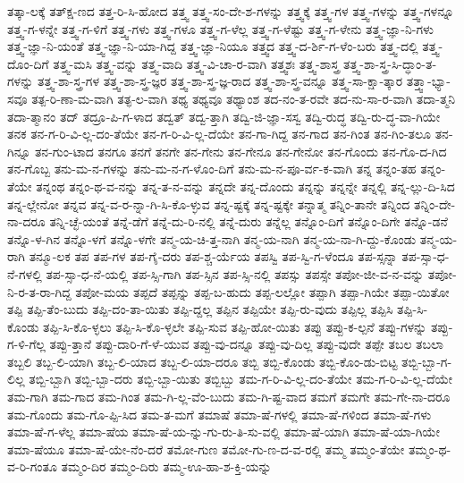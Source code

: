 {ತತ್ಕಾ-ಲಕ್ಕೆ
ತತ್ಕ್ಷ-ಣದ
ತತ್ತ-ರಿ-ಸಿ-ಹೋದ
ತತ್ತ್ವ
ತತ್ತ್ವ-ಸಂ-ದೇ-ಶ-ಗಳನ್ನು
ತತ್ತ್ವಕ್ಕೆ
ತತ್ತ್ವ-ಗಳ
ತತ್ತ್ವ-ಗಳನ್ನು
ತತ್ತ್ವ-ಗಳನ್ನೂ
ತತ್ತ್ವ-ಗ-ಳನ್ನೇ
ತತ್ತ್ವ-ಗ-ಳಿಗೆ
ತತ್ತ್ವ-ಗಳು
ತತ್ತ್ವ-ಗಳೂ
ತತ್ತ್ವ-ಗ-ಳೆಲ್ಲ
ತತ್ತ್ವ-ಗ-ಳೆಷ್ಟು
ತತ್ತ್ವ-ಗ-ಳೇನು
ತತ್ತ್ವ-ಜ್ಞಾ-ನಿ-ಗಳು
ತತ್ತ್ವ-ಜ್ಞಾ-ನಿ-ಯಂತೆ
ತತ್ತ್ವ-ಜ್ಞಾ-ನಿ-ಯಾ-ಗಿದ್ದ
ತತ್ತ್ವ-ಜ್ಞಾ-ನಿಯೂ
ತತ್ತ್ವದ
ತತ್ತ್ವ-ದ-ರ್ಶಿ-ಗ-ಳೆಂ-ಬರು
ತತ್ತ್ವ-ದಲ್ಲಿ
ತತ್ತ್ವ-ದೊಂ-ದಿಗೆ
ತತ್ತ್ವ-ಮಸಿ
ತತ್ತ್ವ-ವನ್ನು
ತತ್ತ್ವ-ವಾದಿ
ತತ್ತ್ವ-ವಿ-ಚಾ-ರ-ವಾಗಿ
ತತ್ತ್ವಶಃ
ತತ್ತ್ವ-ಶಾಸ್ತ್ರ
ತತ್ತ್ವ-ಶಾ-ಸ್ತ್ರ-ಸಿ-ದ್ಧಾಂ-ತ-ಗಳನ್ನು
ತತ್ತ್ವ-ಶಾ-ಸ್ತ್ರ-ಗಳ
ತತ್ತ್ವ-ಶಾ-ಸ್ತ್ರ-ಜ್ಞರ
ತತ್ತ್ವ-ಶಾ-ಸ್ತ್ರ-ಜ್ಞ-ರಾದ
ತತ್ತ್ವ-ಶಾ-ಸ್ತ್ರ-ವನ್ನೂ
ತತ್ತ್ವ-ಸಾ-ಕ್ಷಾ-ತ್ಕಾರ
ತತ್ತ್ವಾ-ಭ್ಯಾ-ಸವೂ
ತತ್ಪ-ರಿ-ಣಾ-ಮ-ವಾಗಿ
ತತ್ಫ-ಲ-ವಾಗಿ
ತಥ್ಯ
ತಥ್ಯವೂ
ತಥ್ಯಾಂಶ
ತದ-ನಂ-ತ-ರವೇ
ತದ-ನು-ಸಾ-ರ-ವಾಗಿ
ತದಾ-ತ್ಮನಿ
ತದಾ-ತ್ಮಾನಂ
ತದ್
ತದ್ರೂ-ಪಿ-ಗ-ಳಾದ
ತದ್ವತ್
ತದ್ವ-ತ್ತಾಗಿ
ತದ್ವಿ-ಜಿ-ಜ್ಞಾ-ಸಸ್ವ
ತದ್ವಿ-ರುದ್ಧ
ತದ್ವಿ-ರು-ದ್ಧ-ವಾ-ಗಿಯೇ
ತನಕ
ತನ-ಗ-ರಿ-ವಿ-ಲ್ಲ-ದಂ-ತೆಯೇ
ತನ-ಗ-ರಿ-ವಿ-ಲ್ಲ-ದೆಯೇ
ತನ-ಗಾ-ಗಿದ್ದ
ತನ-ಗಾದ
ತನ-ಗಿಂತ
ತನ-ಗಿಂ-ತಲೂ
ತನ-ಗಿನ್ನೂ
ತನ-ಗುಂ-ಟಾದ
ತನಗೂ
ತನಗೆ
ತನಗೇ
ತನ-ಗೇನು
ತನ-ಗೇನೂ
ತನ-ಗೇನೋ
ತನ-ಗೊಂದು
ತನ-ಗೊ-ದ-ಗಿದ
ತನ-ಗೊಬ್ಬ
ತನು-ಮ-ನ-ಗಳನ್ನು
ತನು-ಮ-ನ-ಗ-ಳೊಂ-ದಿಗೆ
ತನು-ಮ-ನ-ಪೂ-ರ್ವ-ಕ-ವಾಗಿ
ತನ್ನ
ತನ್ನಂ-ತಹ
ತನ್ನಂ-ತೆಯೇ
ತನ್ನಂಥ
ತನ್ನಂ-ಥ-ವ-ನನ್ನು
ತನ್ನ-ತ-ನ-ವನ್ನು
ತನ್ನದೇ
ತನ್ನ-ದೊಂದು
ತನ್ನನ್ನು
ತನ್ನನ್ನೇ
ತನ್ನಲ್ಲಿ
ತನ್ನ-ಲ್ಲು-ದಿ-ಸಿದ
ತನ್ನ-ಲ್ಲೇನೋ
ತನ್ನವ
ತನ್ನ-ವ-ರ-ನ್ನಾ-ಗಿ-ಸಿ-ಕೊ-ಳ್ಳುವ
ತನ್ನ-ಷ್ಟಕ್ಕೆ
ತನ್ನ-ಷ್ಟಕ್ಕೇ
ತನ್ನಾತ್ಮ
ತನ್ನಿಂ-ತಾನೇ
ತನ್ನಿಂದ
ತನ್ನಿಂ-ದೇ-ನಾ-ದರೂ
ತನ್ನಿ-ಚ್ಛೆ-ಯಂತೆ
ತನ್ನೆ-ಡೆಗೆ
ತನ್ನೆ-ದು-ರಿ-ನಲ್ಲಿ
ತನ್ನೆ-ದುರು
ತನ್ನೆಲ್ಲ
ತನ್ನೊಂ-ದಿಗೆ
ತನ್ನೊಂ-ದಿಗೇ
ತನ್ನೊ-ಡನೆ
ತನ್ನೊ-ಳ-ಗಿನ
ತನ್ನೊ-ಳಗೆ
ತನ್ನೊ-ಳಗೇ
ತನ್ಮ-ಯ-ಚಿ-ತ್ತ-ನಾಗಿ
ತನ್ಮ-ಯ-ನಾಗಿ
ತನ್ಮ-ಯ-ನಾ-ಗಿ-ದ್ದು-ಕೊಂಡು
ತನ್ಮ-ಯ-ರಾಗಿ
ತನ್ಮೂ-ಲಕ
ತಪ
ತಪ-ಗಳ
ತಪ-ಗೈ-ದರು
ತಪ-ಶ್ಚ-ರ್ಯೆಯ
ತಪಸ್ವಿ
ತಪ-ಸ್ವಿ-ಗ-ಳೆಂದೂ
ತಪ-ಸ್ಸನ್ನಾ
ತಪ-ಸ್ಸಾ-ಧ-ನೆ-ಗಳಲ್ಲಿ
ತಪ-ಸ್ಸಾ-ಧ-ನೆ-ಯಲ್ಲಿ
ತಪ-ಸ್ಸಿ-ಗಾಗಿ
ತಪ-ಸ್ಸಿನ
ತಪ-ಸ್ಸಿ-ನಲ್ಲಿ
ತಪಸ್ಸು
ತಪಸ್ಸೇ
ತಪೋ-ಜೀ-ವ-ನ-ವನ್ನು
ತಪೋ-ನಿ-ರ-ತ-ರಾ-ಗಿದ್ದ
ತಪೋ-ಮಯ
ತಪ್ಪದೆ
ತಪ್ಪನ್ನು
ತಪ್ಪ-ಬ-ಹುದು
ತಪ್ಪ-ಲಲ್ಲೋ
ತಪ್ಪಾಗಿ
ತಪ್ಪಾ-ಗಿಯೇ
ತಪ್ಪಾ-ಯಿತೋ
ತಪ್ಪಿ
ತಪ್ಪಿ-ತೆಂ-ಬುದು
ತಪ್ಪಿ-ದಂ-ತಾ-ಯಿತು
ತಪ್ಪಿ-ದ್ದಲ್ಲ
ತಪ್ಪಿನ
ತಪ್ಪಿಯೇ
ತಪ್ಪಿ-ರು-ವುದು
ತಪ್ಪಿಲ್ಲ
ತಪ್ಪಿಸಿ
ತಪ್ಪಿ-ಸಿ-ಕೊಂಡು
ತಪ್ಪಿ-ಸಿ-ಕೊ-ಳ್ಳಲು
ತಪ್ಪಿ-ಸಿ-ಕೊ-ಳ್ಳಲೇ
ತಪ್ಪಿ-ಸುವ
ತಪ್ಪಿ-ಹೋ-ಯಿತು
ತಪ್ಪು
ತಪ್ಪು-ಕ-ಲ್ಪನೆ
ತಪ್ಪು-ಗಳನ್ನು
ತಪ್ಪು-ಗ-ಳಿ-ಗೆಲ್ಲ
ತಪ್ಪು-ತ್ತಾನೆ
ತಪ್ಪು-ದಾರಿ-ಗೆ-ಳೆ-ಯುವ
ತಪ್ಪು-ವು-ದನ್ನೂ
ತಪ್ಪು-ವು-ದಿಲ್ಲ
ತಪ್ಪು-ವುದೇ
ತಪ್ಪೇ
ತಬಲ
ತಬಲಾ
ತಬ್ಬಲಿ
ತಬ್ಬ-ಲಿ-ಯಾಗಿ
ತಬ್ಬ-ಲಿ-ಯಾದ
ತಬ್ಬ-ಲಿ-ಯಾ-ದರೂ
ತಬ್ಬಿ
ತಬ್ಬಿ-ಕೊಂಡು
ತಬ್ಬಿ-ಕೊಂ-ಡು-ಬಿಟ್ಟ
ತಬ್ಬಿ-ಬ್ಬಾ-ಗ-ಲಿಲ್ಲ
ತಬ್ಬಿ-ಬ್ಬಾಗಿ
ತಬ್ಬಿ-ಬ್ಬಾ-ದರು
ತಬ್ಬಿ-ಬ್ಬಾ-ಯಿತು
ತಬ್ಬಿಬ್ಬು
ತಮ-ಗ-ರಿ-ವಿ-ಲ್ಲ-ದಂ-ತೆಯೇ
ತಮ-ಗ-ರಿ-ವಿ-ಲ್ಲ-ದೆಯೇ
ತಮ-ಗಾಗಿ
ತಮ-ಗಾದ
ತಮ-ಗಿಂತ
ತಮ-ಗಿ-ಲ್ಲ-ವೆಂ-ಬುದು
ತಮ-ಗಿ-ಷ್ಟ-ವಾದ
ತಮಗೆ
ತಮಗೇ
ತಮ-ಗೇ-ನಾ-ದರೂ
ತಮ-ಗೊಂದು
ತಮ-ಗೊ-ಪ್ಪಿ-ಸಿದ
ತಮ-ತ-ಮಗೆ
ತಮಾಷೆ
ತಮಾ-ಷೆ-ಗಳಲ್ಲಿ
ತಮಾ-ಷೆ-ಗಳಿಂದ
ತಮಾ-ಷೆ-ಗಳು
ತಮಾ-ಷೆ-ಗ-ಳೆಲ್ಲ
ತಮಾ-ಷೆಯ
ತಮಾ-ಷೆ-ಯ-ನ್ನು-ಗು-ರು-ತಿ-ಸು-ವಲ್ಲಿ
ತಮಾ-ಷೆ-ಯಾಗಿ
ತಮಾ-ಷೆ-ಯಾ-ಗಿಯೇ
ತಮಾ-ಷೆಯೂ
ತಮಾ-ಷೆ-ಯೇ-ನೆಂ-ದರೆ
ತಮೋ-ಗುಣ
ತಮೋ-ಗು-ಣ-ದ-ವ-ರಲ್ಲಿ
ತಮ್ಮ
ತಮ್ಮಂ-ತೆಯೇ
ತಮ್ಮಂ-ಥ-ವ-ರಿ-ಗಂತೂ
ತಮ್ಮಂ-ದಿರ
ತಮ್ಮಂ-ದಿರು
ತಮ್ಮ-ಊ-ಹಾ-ಶ-ಕ್ತಿ-ಯನ್ನು
}
